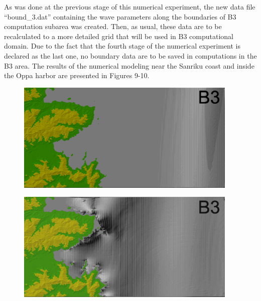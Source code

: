 \documentclass{aip-cp}
\begin{document}
As was done at the previous stage of this numerical experiment, the new data 
file ``bound{\_}3.dat'' containing the wave parameters along the boundaries 
of B3 computation subarea was created. Then, as usual, these data are to be 
recalculated to a more detailed grid that will be used in B3 computational 
domain. Due to the fact that the fourth stage of the numerical experiment is 
declared as the last one, no boundary data are to be saved in computations 
in the B3 area. The results of the numerical modeling near the Sanriku coast 
and inside the Oppa harbor are presented in Figures 9-10.

\begin{figure}[h]
  \centerline{\includegraphics[width=300pt]{art/Fig_09.png}}
  \caption{}
\end{figure}

\begin{figure}[h]
  \centerline{\includegraphics[width=300pt]{art/Fig_10.png}}
  \caption{}
\end{figure}
\end{document}
